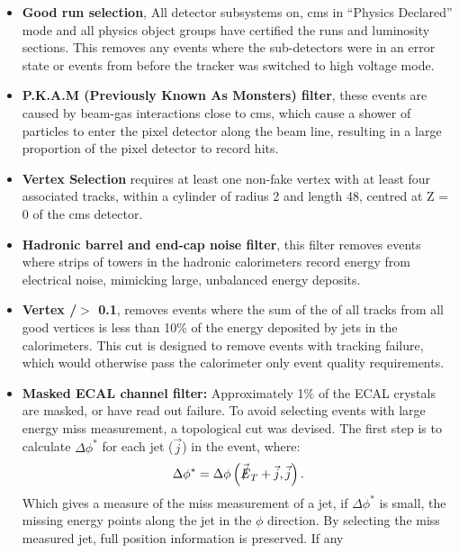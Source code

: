 \begin{itemize}
\item \textbf{Good run selection}, All detector subsystems on, \ac{cms} in 
``Physics Declared'' mode and all physics object groups have certified the runs 
and luminosity sections. This removes any events where the sub-detectors were 
in an error state or events from before the tracker was switched to high 
voltage mode.
\item \textbf{P.K.A.M (Previously Known As Monsters) filter}, these events are 
caused by beam-gas interactions close to \ac{cms}, which cause a shower of 
particles to enter the pixel detector along the beam line, resulting in a large 
proportion of the pixel detector to record hits.
\item \textbf{Vertex Selection} requires at least one non-fake vertex with at 
least four associated tracks, within a cylinder of radius \unit{2}{\cm} and 
length \unit{48}{\cm}, centred at Z = 0 of the \ac{cms} detector.
\item \textbf{Hadronic barrel and end-cap noise filter}, this filter removes 
events where strips of towers in the hadronic calorimeters record energy from 
electrical noise, mimicking large, unbalanced energy deposits.
\item \textbf{Vertex \PT/\HT $>$ 0.1}, removes events where the sum of the 
\PT of all tracks from all good vertices is less than 10$\%$ of the energy 
deposited by jets in the calorimeters. This cut is designed to remove events 
with tracking failure, which would otherwise pass the calorimeter only event 
quality requirements.
\item\textbf{Masked ECAL channel filter:} Approximately 1$\%$ of the ECAL 
crystals are masked, or have read out failure. To avoid selecting events with 
large energy miss measurement, a topological cut was devised. The first step is 
to calculate $\Delta\phi^{*}$ for each jet ($\vec{j}$) in the event, where:
\begin{equation}
  \Delta\phi^{*} = \Delta\phi\left(\vec{\slashed{E}}_{T}+\vec{j},\vec{j} \right).
  \label{eq:biasedDphi}
\end{equation}
Which gives a measure of the miss measurement of a jet, if $\Delta\phi^{*}$ is 
small, the missing energy points along the jet in the $\phi$ direction. By 
selecting the miss measured jet, full position information is preserved. If any 

\end{itemize}
